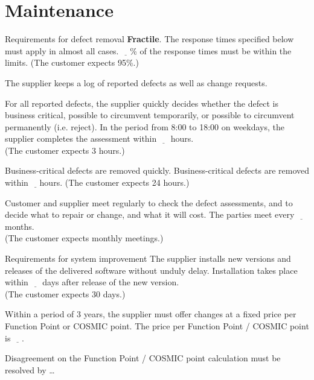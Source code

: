 \documentclass[Main]{subfiles}
\begin{document}
\section{Maintenance}

\begin{DynTable}{Requirements for defect removal}
{\textbf{Fractile}. The response times specified below must apply in almost all cases.}
{$\underline{\quad}$\% of the response times must be within the limits. 
(The customer expects 95\%.)}
{}


{The supplier keeps a log of reported defects as well as change requests.}
{}
{}

{For all reported defects, the supplier quickly decides whether the defect is business critical, possible to circumvent temporarily, or possible to circumvent permanently (i.e. reject).}
{In the period from 8:00 to 18:00 on weekdays, the supplier completes the assessment within $\underline{\quad}$ hours. \\
(The customer expects 3 hours.)}
{}

{Business-critical defects are removed quickly. }
{Business-critical defects are removed within $\underline{\quad}$hours. 
(The customer expects 24 hours.)}
{}

{Customer and supplier meet regularly to check the defect assessments, and to decide what to repair or change, and what it will cost.}
{The parties meet every $\underline{\quad}$ months.\\
(The customer expects monthly meetings.)}
{}


\end{DynTable}

\begin{DynTable}{Requirements for system improvement}
{The supplier installs new versions and releases of the delivered software without unduly delay.}
{Installation takes place within $\underline{\quad}$ days after release of the new version.\\
(The customer expects 30 days.)}
{}

{Within a period of 3 years, the supplier must offer changes at a fixed price per Function Point or COSMIC point.}
{The price per Function Point / COSMIC point is $\underline{\quad}$.}
{}

{Disagreement on the Function Point / COSMIC point calculation must be resolved by}
{\dots}
{}

\end{DynTable}
\end{document}
